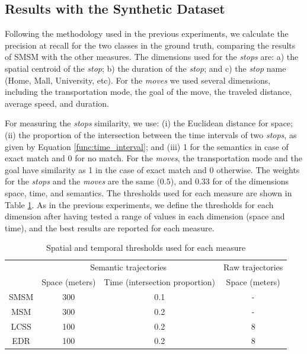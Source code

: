 \subsection{Results with the Synthetic Dataset}
{Following the methodology used in the previous experiments, we calculate the precision at recall for the two classes in the ground truth, comparing the results of SMSM with the other measures. The dimensions used for the \emph{stops} are: a) the spatial centroid of the \emph{stop}; b) the duration of the \emph{stop}; and c) the \emph{stop} name (Home, Mall, University, etc). For the \emph{moves} we used several dimensions, including  the transportation mode, the goal of the move, the traveled distance, average speed, and duration.}

{For measuring the \emph{stops} similarity, we use: (i) the Euclidean distance for space; (ii) the proportion of the intersection between the time intervals of two \emph{stops}, as given by Equation {\ref{func:time_interval}}; and (iii) 1 for the semantics in case of exact match and 0 for no match. For the \emph{moves}, the transportation mode and the goal have  similarity as 1 in the case of exact match and 0 otherwise. The weights for the \emph{stops} and the \emph{moves} are the same ($0.5$), and $0.33$ for of the  dimensions space, time, and semantics. The thresholds used for each measure are shown in Table {\ref{tab:hermoupolis_thresholds}}.  As in the previous experiments, we define the thresholds for each dimension after having tested a range of values in each dimension (space and time), and the best results are reported for each measure.}

\begin{table}[!h]
\scriptsize
  \centering
  \begin{tabular}{|c|c|c|c|}
  \hline
  & \multicolumn{2}{c|}{Semantic trajectories} & \multicolumn{1}{c|}{Raw trajectories} \\
 	\cline{2-4}
  & Space (meters)& Time (intersection proportion) & Space (meters) \\
  \hline
 SMSM & 300 & 0.1 & - \\
 MSM & 300 & 0.2 & - \\
 LCSS & 100 & 0.2 & 8 \\
 EDR & 100 & 0.2 & 8 \\
    \hline
  \end{tabular}
  \caption{Spatial and temporal thresholds used for each measure}
  \label{tab:hermoupolis_thresholds}
\end{table}

